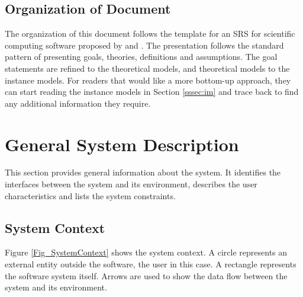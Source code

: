 \documentclass[12pt]{article}
\begin{document}

\subsection{Organization of Document}


The organization of this document follows the template for an SRS for
scientific computing software proposed by \cite{Koothoor2013} and
\cite{SmithAndLai2005}. The presentation
follows the standard pattern of presenting goals, theories, definitions and
assumptions. The goal statements are refined to the theoretical models, and
theoretical
models to the instance models. For readers that would like a more bottom-up
approach, they can start reading the instance models in Section
\ref{sssec:im} and trace back to find any additional information they
require. 

\section{General System Description}

This section provides general information about the system.  It identifies the
interfaces between the system and its environment, describes the user
characteristics and lists the system constraints.  

\subsection{System Context}
Figure \ref{Fig_SystemContext} shows the system context.  A circle represents an
external entity outside the software, the user in this case.  A rectangle
represents the software system itself.  Arrows are used to show the data
flow between the system and its environment. \\ \\ \\ \\ \\ \\ \\
\end{document}
